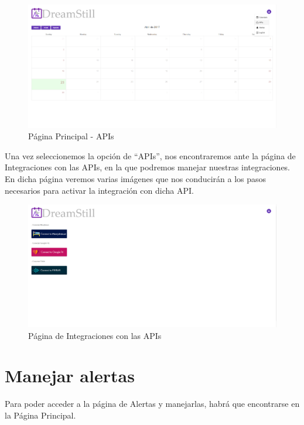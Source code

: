 \documentclass[11pt,openany]{book}
\begin{document}
\begin{figure}[H]
\centering
\includegraphics[totalheight=7cm]{manualUsuario/apis.png}
\caption{Página Principal - APIs}
\end{figure}

Una vez seleccionemos la opción de ``APIs'', nos encontraremos ante la página de Integraciones con las APIs, en la que podremos manejar nuestras integraciones. En dicha página veremos varias imágenes que nos conducirán a los pasos necesarios para activar la integración con dicha API.

\begin{figure}[H]
\centering
\includegraphics[totalheight=7cm]{manualUsuario/paginaApis.png}
\caption{Página de Integraciones con las APIs}
\end{figure}

\section{Manejar alertas}

Para poder acceder a la página de Alertas y manejarlas, habrá que encontrarse en la Página Principal.
\end{document}
